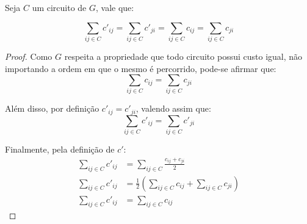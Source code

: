         \begin{lemma}
            \label{lemma:pccv}
            Seja $C$ um circuito de $G$, vale que:

            \[
                \sum_{ij \in C} c'_{ij} = \sum_{ij \in C} c'_{ji} =  \sum_{ij \in C} c_{ij} =  \sum_{ij \in C} c_{ji}
            \]
        \end{lemma}
        \begin{proof}
            Como $G$ respeita a propriedade que todo circuito possui custo igual, não importando a ordem em que o mesmo é percorrido, pode-se afirmar que:
            \[
                \sum_{ij \in C} c_{ij} =  \sum_{ij \in C} c_{ji}
            \]

            Além disso, por definição $c'_{ij} = c'_{ji}$, valendo assim que:
            \[
                \sum_{ij \in C} c'_{ij} = \sum_{ij \in C} c'_{ji} 
            \]

            Finalmente, pela definição de $c'$: 
            \begin{align*}
                \sum_{ij \in C} c'_{ij} &= \sum_{ij \in C} \frac{c_{ij} + c_{ji}}{2} \\
                \sum_{ij \in C} c'_{ij} &= \frac{1}{2} \left(\sum_{ij \in C}c_{ij} + \sum_{ij \in C}c_{ji} \right) \\
                \sum_{ij \in C} c'_{ij} &= \sum_{ij \in C} c_{ij}
            \end{align*}

        \end{proof}


